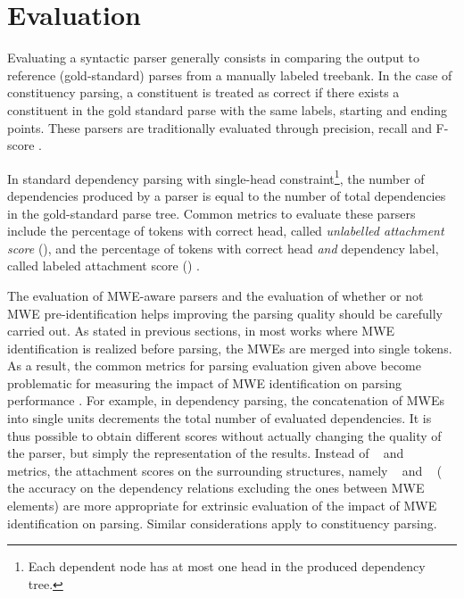 \documentclass[output=paper]{LSP/langsci}
\begin{document}
  

%
\section{Evaluation}
\label{sec:evaluation}



Evaluating a syntactic parser generally consists in comparing the output to reference  (gold-standard) parses from  a manually labeled treebank.
In the case of constituency parsing, a constituent is treated as correct if there exists a constituent in the gold standard parse with the same labels, starting and ending points. These parsers are traditionally evaluated through precision, recall and F-score \citep{abney1991procedure,sekine1997evalb}. 

In standard dependency parsing with single-head constraint\footnote{Each dependent node has at most one head in the produced dependency tree.}, the number of dependencies produced by a parser is equal to the number of total dependencies in the gold-standard parse tree. Common metrics to evaluate these parsers include the percentage of tokens with correct head, called \emph{unlabelled attachment score} (\asu), and the percentage of tokens with correct head \emph{and} dependency label, called labeled attachment score (\asl) \citep{conllx,nilsson2007conll}. 

The evaluation of MWE-aware parsers and the evaluation of  whether or not MWE pre-identification helps  improving the parsing quality should be carefully carried out.
As stated in previous sections, in most works where MWE identification is realized before parsing, the MWEs are merged into  single tokens.  
As a result, the common metrics for parsing evaluation given above become problematic for measuring the impact of MWE identification on parsing performance \citep{eryigit:2011:mes:2206359.2206365}.
For example, in dependency parsing,
the concatenation of MWEs into single units  decrements the total number of evaluated dependencies. It is thus possible to obtain different scores without actually changing the quality of the parser, but simply the representation of the results. Instead of \asu~ and \asl~ metrics, the attachment scores on the surrounding structures, namely \asus~ and \asls~ (\ie{} the accuracy on the dependency relations excluding the ones between MWE elements) are more appropriate for extrinsic evaluation of the impact of MWE identification on parsing. Similar considerations apply to constituency parsing.
\end{document}
